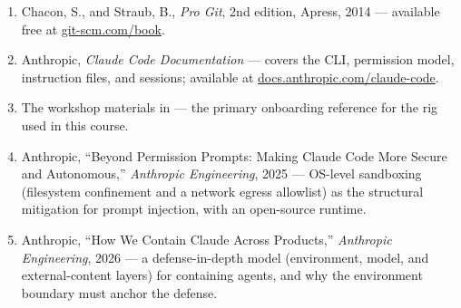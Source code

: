 \begin{small}
\begin{enumerate}
\item Chacon, S., and Straub, B., \emph{Pro Git}, 2nd edition, Apress, 2014 — available free at \href{https://git-scm.com/book}{git-scm.com/book}.
\item Anthropic, \emph{Claude Code Documentation} — covers the CLI, permission model, instruction files, and sessions; available at \href{https://docs.anthropic.com/claude-code}{docs.anthropic.com/claude-code}.
\item The workshop materials in  — the primary onboarding reference for the rig used in this course.
\item Anthropic, ``Beyond Permission Prompts: Making Claude Code More Secure and Autonomous,'' \emph{Anthropic Engineering}, 2025 — OS-level sandboxing (filesystem confinement and a network egress allowlist) as the structural mitigation for prompt injection, with an open-source runtime.
\item Anthropic, ``How We Contain Claude Across Products,'' \emph{Anthropic Engineering}, 2026 — a defense-in-depth model (environment, model, and external-content layers) for containing agents, and why the environment boundary must anchor the defense.
\end{enumerate}
\end{small}
